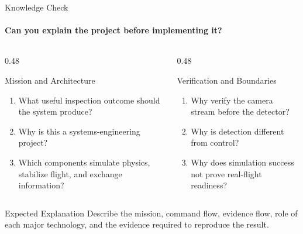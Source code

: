 \begin{frame}{Knowledge Check}
    \framesubtitle{Can you explain the project before implementing it?}
    \footnotesize
    \begin{columns}[T,onlytextwidth]
        \begin{column}{0.48\textwidth}
            \begin{block}{Mission and Architecture}
                \begin{enumerate}
                    \setlength{\itemsep}{0.2em}
                    \item What useful inspection outcome should the system produce?
                    \item Why is this a systems-engineering project?
                    \item Which components simulate physics, stabilize flight, and exchange information?
                \end{enumerate}
            \end{block}
        \end{column}
        \begin{column}{0.48\textwidth}
            \begin{block}{Verification and Boundaries}
                \begin{enumerate}
                    \setlength{\itemsep}{0.2em}
                    \item Why verify the camera stream before the detector?
                    \item Why is detection different from control?
                    \item Why does simulation success not prove real-flight readiness?
                \end{enumerate}
            \end{block}
        \end{column}
    \end{columns}
    \begin{exampleblock}{Expected Explanation}
        Describe the mission, command flow, evidence flow, role of each major technology, and the evidence required to reproduce the result.
    \end{exampleblock}
\end{frame}




